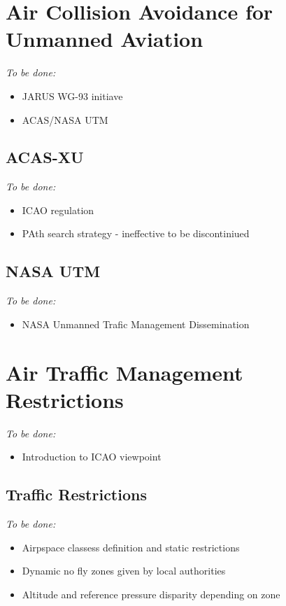 \section{Air Collision Avoidance for Unmanned Aviation}
    \emph{To be done:}
    \begin{itemize}
        \item JARUS WG-93 initiave
        \item ACAS/NASA UTM
    \end{itemize} 
\subsection{ACAS-XU}
    \emph{To be done:}
    \begin{itemize}
        \item ICAO regulation 
        \item PAth search strategy - ineffective to be discontiniued
    \end{itemize} 

\subsection{NASA UTM}
    \emph{To be done:}
    \begin{itemize}
        \item NASA Unmanned Trafic Management Dissemination
    \end{itemize} 

\section{Air Traffic Management Restrictions}
    \emph{To be done:}
    \begin{itemize}
        \item Introduction to ICAO viewpoint
    \end{itemize} 
\subsection{Traffic Restrictions}
    \emph{To be done:}
    \begin{itemize}
        \item Airpspace classess definition and static restrictions
        \item Dynamic no fly zones given by local authorities
        \item Altitude and reference pressure disparity depending on zone
    \end{itemize} 
